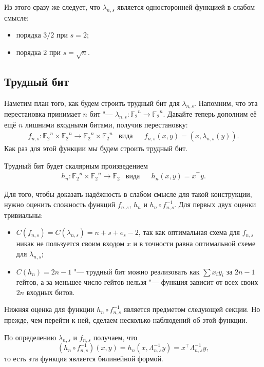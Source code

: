 \documentclass[oneside, a4paper]{article}
\theoremstyle{plain}
\theoremstyle{remark}
\newcommand\F{\ensuremath{{\mathbb F}_2}}
\begin{document}
Из этого сразу же следует, что $\lambda_{n, s}$ является односторонней функцией
в слабом смысле:
\begin{itemize}
\item порядка $3/2$ при $s = 2$;
\item порядка $2$ при $s = \sqrt{n}$.
\end{itemize}

\subsection{Трудный бит}

Наметим план того, как будем строить трудный бит для $\lambda_{n, s}$.
Напомним, что эта перестановка принимает $n$ бит "--- $\lambda_{n, s} : \F^n
\to \F^n$. Давайте теперь дополним её ещё $n$ лишними входными битами, получив
перестановку:
\[
\begin{aligned}
&f_{n, s} : \F^n \times \F^n \to \F^n \times \F^n
&
\text{вида}&
&
f_{n, s}(x, y) = (x, \lambda_{n, s}(y)).&
\end{aligned}
\]
Как раз для этой функции мы будем строить трудный бит.

Трудный бит будет скалярным произведением
\[
\begin{aligned}
&h_n : \F^n \times \F^n \to \F
&
\text{вида}&
&
h_n(x, y) = x^\top y.&
\end{aligned}
\]

Для того, чтобы доказать надёжность в слабом смысле для такой конструкции, нужно
оценить сложность функций $f_{n ,s}$, $h_n$ и $h_n \circ f_{n, s}^{-1}$. Для
первых двух оценки тривиальны:
\begin{itemize}
\item $C(f_{n, s}) = C(\lambda_{n, s}) = n + s + e_s - 2$, так как оптимальная
схема для $f_{n, s}$ никак не пользуется своим входом $x$ и в точности равна
оптимальной схеме для $\lambda_{n, s}$;
\item $C(h_n) = 2n - 1$ "--- трудный бит можно реализовать как $\sum x_i y_i$ за
$2n - 1$ гейтов, а за меньшее число гейтов нельзя "--- функция зависит от всех
своих $2n$ входных битов.
\end{itemize}

Нижняя оценка для функции $h_n \circ f_{n, s}^{-1}$ является предметом следующей
секции. Но прежде, чем перейти к ней, сделаем несколько наблюдений об этой
функции.

По определению $\lambda_{n, s}$ и $f_{n, s}$ получаем, что
\[
(h_n \circ f_{n, s}^{-1})(x, y) = h_n(x, \Lambda_{n, s}^{-1}y) = x^\top \Lambda_{n, s}^{-1} y,
\]
то есть эта функция является билинейной формой.
\end{document}
